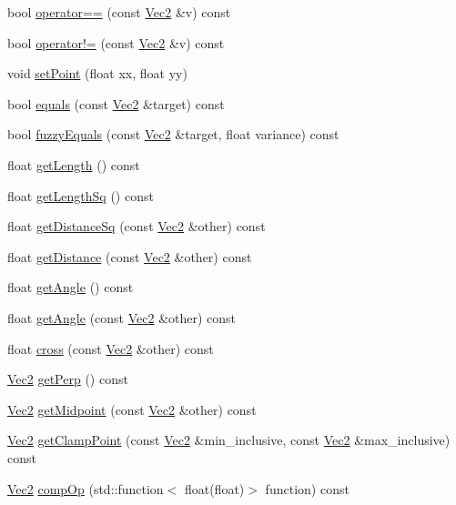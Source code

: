 \begin{DoxyCompactItemize}
\item 
bool \hyperlink{classVec2_a08e7dcf7a04bd18d56d41dc03104ba64}{operator==} (const \hyperlink{classVec2}{Vec2} \&v) const
\item 
bool \hyperlink{classVec2_a7d0cfd297b55abcb15ff1137cde32edd}{operator!=} (const \hyperlink{classVec2}{Vec2} \&v) const
\item 
void \hyperlink{classVec2_a3bfb9fcb76dde6c03534f94906bb33fc}{set\+Point} (float xx, float yy)
\item 
bool \hyperlink{classVec2_a56fd3f594c7532a7ba84ea3473257671}{equals} (const \hyperlink{classVec2}{Vec2} \&target) const
\item 
bool \hyperlink{classVec2_a5ac04604789866d317ade8f4579b37a9}{fuzzy\+Equals} (const \hyperlink{classVec2}{Vec2} \&target, float variance) const
\item 
float \hyperlink{classVec2_ae486d0799b31a9831eef5a35164a4846}{get\+Length} () const
\item 
float \hyperlink{classVec2_a0b3f546ad8db551b9428d147318aee34}{get\+Length\+Sq} () const
\item 
float \hyperlink{classVec2_a5f2fee415aa806bdaad99e984cc991eb}{get\+Distance\+Sq} (const \hyperlink{classVec2}{Vec2} \&other) const
\item 
float \hyperlink{classVec2_a44c9c4de94d07758f73195088788ded4}{get\+Distance} (const \hyperlink{classVec2}{Vec2} \&other) const
\item 
float \hyperlink{classVec2_aaca24d4a0550be8892c4d84c7b37e027}{get\+Angle} () const
\item 
float \hyperlink{classVec2_a94017db9e730f5935efa27aee1bf7df7}{get\+Angle} (const \hyperlink{classVec2}{Vec2} \&other) const
\item 
float \hyperlink{classVec2_a4ff58f0ee9e2c3e7432407f256fade58}{cross} (const \hyperlink{classVec2}{Vec2} \&other) const
\item 
\hyperlink{classVec2}{Vec2} \hyperlink{classVec2_a0b6b1c97713d11486dc898aa203f1a72}{get\+Perp} () const
\item 
\hyperlink{classVec2}{Vec2} \hyperlink{classVec2_ab4a3e36ded233d2b3b3f2a6a3ff9ca2c}{get\+Midpoint} (const \hyperlink{classVec2}{Vec2} \&other) const
\item 
\hyperlink{classVec2}{Vec2} \hyperlink{classVec2_aa51d29f01d1826b236669a718569ffd2}{get\+Clamp\+Point} (const \hyperlink{classVec2}{Vec2} \&min\+\_\+inclusive, const \hyperlink{classVec2}{Vec2} \&max\+\_\+inclusive) const
\item 
\hyperlink{classVec2}{Vec2} \hyperlink{classVec2_a50a6f35ecf43481fc94a1c5a3fcd62d9}{comp\+Op} (std\+::function$<$ float(float)$>$ function) const

\end{DoxyCompactItemize}
